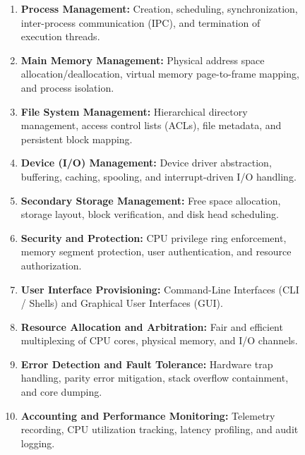 \begin{figure}[htbp]
\centering
\begin{tcolorbox}[colback=codebg, colframe=primary, title=\textbf{Ten Fundamental Architectural Responsibilities of an OS}]
\begin{enumerate}
    \item \textbf{Process Management:} Creation, scheduling, synchronization, inter-process communication (IPC), and termination of execution threads.
    \item \textbf{Main Memory Management:} Physical address space allocation/deallocation, virtual memory page-to-frame mapping, and process isolation.
    \item \textbf{File System Management:} Hierarchical directory management, access control lists (ACLs), file metadata, and persistent block mapping.
    \item \textbf{Device (I/O) Management:} Device driver abstraction, buffering, caching, spooling, and interrupt-driven I/O handling.
    \item \textbf{Secondary Storage Management:} Free space allocation, storage layout, block verification, and disk head scheduling.
    \item \textbf{Security and Protection:} CPU privilege ring enforcement, memory segment protection, user authentication, and resource authorization.
    \item \textbf{User Interface Provisioning:} Command-Line Interfaces (CLI / Shells) and Graphical User Interfaces (GUI).
    \item \textbf{Resource Allocation and Arbitration:} Fair and efficient multiplexing of CPU cores, physical memory, and I/O channels.
    \item \textbf{Error Detection and Fault Tolerance:} Hardware trap handling, parity error mitigation, stack overflow containment, and core dumping.
    \item \textbf{Accounting and Performance Monitoring:} Telemetry recording, CPU utilization tracking, latency profiling, and audit logging.
\end{enumerate}
\end{tcolorbox}
\end{figure}

